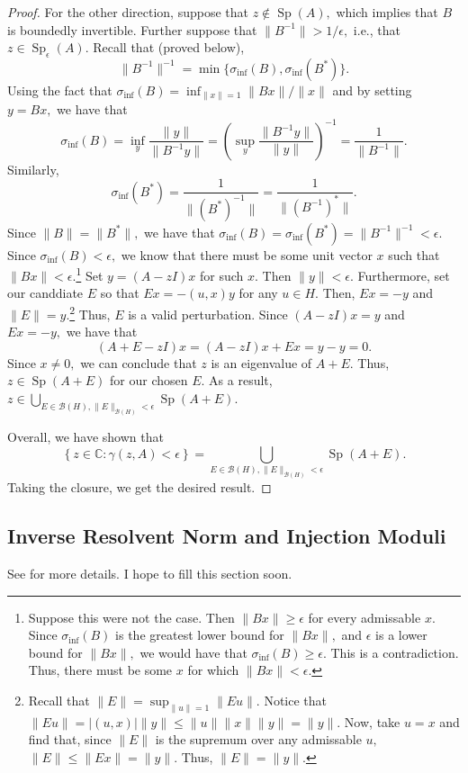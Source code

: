 \documentclass[12pt,a4paper]{article}
\newcommand{\Sp}[1]{\operatorname{Sp}\!\left(#1\right)}
\newcommand{\Spe}[1]{\operatorname{Sp}_{\epsilon}\!\left(#1\right)}
\theoremstyle{boldthm}
\theoremstyle{bolddefn}
\begin{document}
\begin{proof}
    For the other direction, suppose that $z \notin \Sp{A},$ which implies that $B$ is boundedly invertible. Further suppose that $\|B^{-1}\| > 1/\epsilon,$ i.e., that $z \in \Spe{A}.$ Recall that (proved below), 
    \begin{equation}
        \|B^{-1} \|^{-1} = \min \{ \sigma_{\inf}(B), \sigma_{\inf}(B^*) \}.
    \end{equation}
    Using the fact that $\sigma_{\inf}(B) = \inf_{\|x\| = 1} \|Bx\| / \|x\|$ and by setting $y = Bx,$ we have that 
    \begin{equation}
        \sigma_{\inf}(B) = \inf_{y} \frac{\|y\|}{ \|B^{-1}y \|} = \left(  \sup_y \frac{\|B^{-1} y \|}{ \| y \| }\right)^{-1} = \frac{1}{\|B^{-1} \|}.
    \end{equation}
    Similarly, 
    \begin{equation}
        \sigma_{\inf}(B^*) = \frac{1}{\|(B^*)^{-1}\|} = \frac{1}{\|(B^{-1})^*\|}.
    \end{equation}
    Since $\|B\| = \|B^*\|,$ we have that $\sigma_{\inf}(B) = \sigma_{\inf}(B^*) = \|B^{-1}\|^{-1} < \epsilon.$ Since $\sigma_{\inf}(B) < \epsilon,$ we know that there must be some unit vector $x$ such that $\|Bx\| < \epsilon.$\footnote{Suppose this were not the case. Then $\|Bx\| \ge \epsilon$ for every admissable $x.$ Since $\sigma_{\inf}(B)$ is the greatest lower bound for $\|Bx\|,$ and $\epsilon$ is a lower bound for $\|Bx\|,$ we would have that $\sigma_{\inf}(B) \ge \epsilon.$ This is a contradiction. Thus, there must be some $x$ for which $\|Bx\| < \epsilon.$ }
    Set $y = (A-zI)x$ for such $x.$ Then $\|y\| < \epsilon.$ Furthermore, set our canddiate $E$ so that $Ex = -(u, x)y$ for any $u \in H.$ Then, $Ex = -y$ and $\|E \| = y.$\footnote{Recall that $\|E\| = \sup_{\|u\|=1} \|Eu\|.$ Notice that $\|Eu\| = |(u, x)|\|y\| \le \|u\| \|x\| \|y\| = \|y\|.$ Now, take $u=x$ and find that, since $\|E\|$ is the supremum over any admissable $u,$ $\|E\| \le \|Ex\| = \|y\|.$ Thus, $\|E\| = \|y\|.$} 
    Thus, $E$ is a valid perturbation. Since $(A-zI)x=y$ and $Ex=-y,$ we have that
    \begin{equation}
        (A+E-zI)x = (A-zI)x + Ex = y-y=0.
    \end{equation}
    Since $x \ne 0,$ we can conclude that $z$ is an eigenvalue of $A+E.$ Thus, $z \in \Sp{A+E}$ for our chosen $E.$ As a result, $z \in \bigcup_{E \in \mathcal{B}(H), \|E\|_{\mathcal{B}(H)} < \epsilon} \operatorname{Sp}(A+E).$

    Overall, we have shown that 
    \begin{equation}
        \left\{ z \in \mathbb{C} : \gamma(z, A) < \epsilon  \right\} = \bigcup_{E \in \mathcal{B}(H), \|E\|_{\mathcal{B}(H)} < \epsilon} \operatorname{Sp}(A+E).
    \end{equation}
    Taking the closure, we get the desired result. 
    

\end{proof}




\subsection{Inverse Resolvent Norm and Injection Moduli}

See \cite[Lemma 1.2.5]{Matt} for more details. I hope to fill this section soon. 






\newpage


\end{document}
